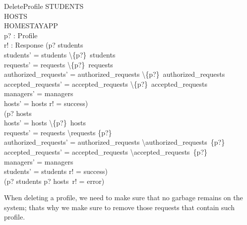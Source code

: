 \documentclass[11pt]{article}
\begin{document}
\begin{schema}{DeleteProfile}
	\Delta STUDENTS\\
	\Delta HOSTS\\
	\Delta HOMESTAYAPP\\
	p? : Profile\\
	r! : Response
\where
	(p? \in \dom students\ \wedge\\
	\indent students' = students \backslash \{p?\}\ \dres students\ \wedge\\
	\indent requests' = requests \backslash \{p?\}\ \dres requests\ \wedge\\
	\indent authorized\_requests' = authorized\_requests \backslash \{p?\}\ \dres authorized\_requests\ \wedge\\
	\indent accepted\_requests' = accepted\_requests \backslash \{p?\}\ \dres accepted\_requests\ \wedge\\
	\indent managers' = managers\\
	\indent hosts' = hosts \wedge r! = success)\ \vee\\
	(p? \in \dom hosts\ \wedge\\
	\indent hosts' = hosts \backslash \{p?\}\ \dres hosts\ \wedge\\
	\indent requests' = requests \backslash requests \rres \{p?\}\ \wedge\\
	\indent authorized\_requests' = authorized\_requests \backslash authorized\_requests\ \rres \{p?\}\ \wedge\\
	\indent accepted\_requests' = accepted\_requests \backslash accepted\_requests\ \rres \{p?\} \wedge\\
	\indent managers' = managers\\
	\indent students' = students \wedge r! = success)\ \vee\\
	(p? \not\in \dom students \wedge p? \not\in \dom hosts\ \wedge r! = error)
\end{schema}
When deleting a profile, we need to make sure that no garbage remains on the system; thats why we make sure to remove those requests that contain such profile.
\end{document}

